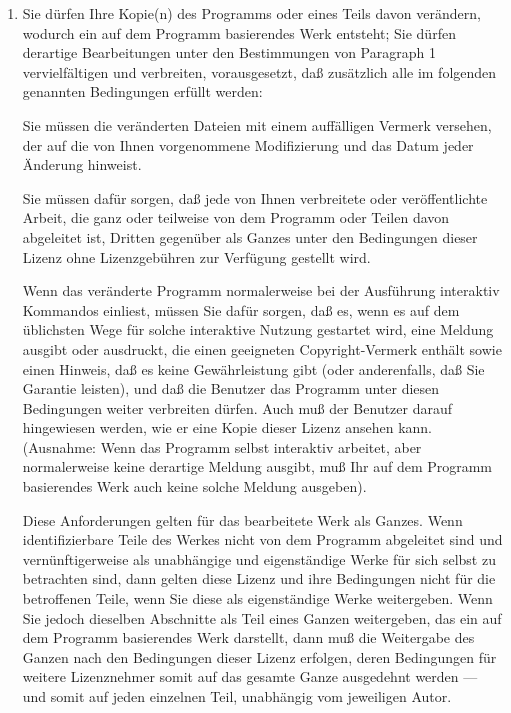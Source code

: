 {\begin{enumerate}
Sie dürfen für den physikalischen Vorgang des Zugänglichmachens einer Kopie eine Gebühr verlangen. Wenn Sie es wünschen, dürfen Sie auch gegen Entgelt eine Garantie für das Programm anbieten.

\item Sie dürfen Ihre Kopie(n) des Programms oder eines Teils davon verändern, wodurch ein auf dem Programm basierendes Werk entsteht; Sie dürfen derartige Bearbeitungen unter den Bestimmungen von Paragraph 1 vervielfältigen und verbreiten, vorausgesetzt, daß zusätzlich alle im folgenden genannten Bedingungen erfüllt werden:

    Sie müssen die veränderten Dateien mit einem auffälligen Vermerk versehen, der auf die von Ihnen vorgenommene Modifizierung und das Datum jeder Änderung hinweist.

    Sie müssen dafür sorgen, daß jede von Ihnen verbreitete oder veröffentlichte Arbeit, die ganz oder teilweise von dem Programm oder Teilen davon abgeleitet ist, Dritten gegenüber als Ganzes unter den Bedingungen dieser Lizenz ohne Lizenzgebühren zur Verfügung gestellt wird.

    Wenn das veränderte Programm normalerweise bei der Ausführung interaktiv Kommandos einliest, müssen Sie dafür sorgen, daß es, wenn es auf dem üblichsten Wege für solche interaktive Nutzung gestartet wird, eine Meldung ausgibt oder ausdruckt, die einen geeigneten Copyright-Vermerk enthält sowie einen Hinweis, daß es keine Gewährleistung gibt (oder anderenfalls, daß Sie Garantie leisten), und daß die Benutzer das Programm unter diesen Bedingungen weiter verbreiten dürfen. Auch muß der Benutzer darauf hingewiesen werden, wie er eine Kopie dieser Lizenz ansehen kann. (Ausnahme: Wenn das Programm selbst interaktiv arbeitet, aber normalerweise keine derartige Meldung ausgibt, muß Ihr auf dem Programm basierendes Werk auch keine solche Meldung ausgeben).

Diese Anforderungen gelten für das bearbeitete Werk als Ganzes. Wenn identifizierbare Teile des Werkes nicht von dem Programm abgeleitet sind und vernünftigerweise als unabhängige und eigenständige Werke für sich selbst zu betrachten sind, dann gelten diese Lizenz und ihre Bedingungen nicht für die betroffenen Teile, wenn Sie diese als eigenständige Werke weitergeben. Wenn Sie jedoch dieselben Abschnitte als Teil eines Ganzen weitergeben, das ein auf dem Programm basierendes Werk darstellt, dann muß die Weitergabe des Ganzen nach den Bedingungen dieser Lizenz erfolgen, deren Bedingungen für weitere Lizenznehmer somit auf das gesamte Ganze ausgedehnt werden --- und somit auf jeden einzelnen Teil, unabhängig vom jeweiligen Autor.


\end{enumerate}}
